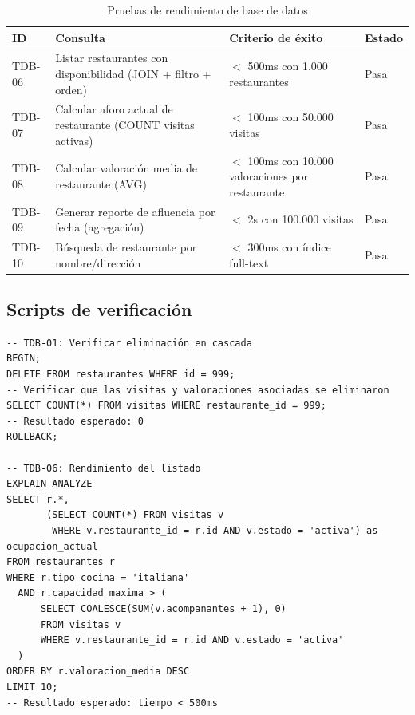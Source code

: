 \begin{table}[H]
    \centering
    \caption{Pruebas de rendimiento de base de datos}
    \label{tab:db_rendimiento}
    \small
    \begin{tabular}{|>{\raggedright\arraybackslash}p{}|>{\raggedright\arraybackslash}p{}|>{\raggedright\arraybackslash}p{}|>{\raggedright\arraybackslash}p{}|}
        \hline
        \textbf{ID} & \textbf{Consulta} & \textbf{Criterio de éxito} & \textbf{Estado} \\
        \hline
        TDB-06 & Listar restaurantes con disponibilidad (JOIN + filtro + orden) & $<$ 500ms con 1.000 restaurantes & Pasa \\
        \hline
        TDB-07 & Calcular aforo actual de restaurante (COUNT visitas activas) & $<$ 100ms con 50.000 visitas & Pasa \\
        \hline
        TDB-08 & Calcular valoración media de restaurante (AVG) & $<$ 100ms con 10.000 valoraciones por restaurante & Pasa \\
        \hline
        TDB-09 & Generar reporte de afluencia por fecha (agregación) & $<$ 2s con 100.000 visitas & Pasa \\
        \hline
        TDB-10 & Búsqueda de restaurante por nombre/dirección & $<$ 300ms con índice full-text & Pasa \\
        \hline
    \end{tabular}
\end{table}

\subsection{Scripts de verificación}

\begin{verbatim}
-- TDB-01: Verificar eliminación en cascada
BEGIN;
DELETE FROM restaurantes WHERE id = 999;
-- Verificar que las visitas y valoraciones asociadas se eliminaron
SELECT COUNT(*) FROM visitas WHERE restaurante_id = 999;
-- Resultado esperado: 0
ROLLBACK;

-- TDB-06: Rendimiento del listado
EXPLAIN ANALYZE
SELECT r.*, 
       (SELECT COUNT(*) FROM visitas v 
        WHERE v.restaurante_id = r.id AND v.estado = 'activa') as ocupacion_actual
FROM restaurantes r
WHERE r.tipo_cocina = 'italiana'
  AND r.capacidad_maxima > (
      SELECT COALESCE(SUM(v.acompanantes + 1), 0) 
      FROM visitas v 
      WHERE v.restaurante_id = r.id AND v.estado = 'activa'
  )
ORDER BY r.valoracion_media DESC
LIMIT 10;
-- Resultado esperado: tiempo < 500ms
\end{verbatim}

